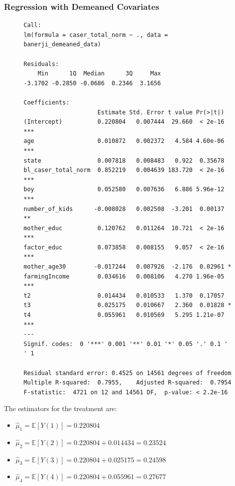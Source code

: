 \documentclass{article}
\begin{document}
\subsubsection*{Regression with Demeaned Covariates}
\begin{figure}[H]
\begin{lstlisting}[style=RstyleComment, caption=Regression with Demeaned Covariates]
Call:
lm(formula = caser_total_norm ~ ., data = banerji_demeaned_data)

Residuals:
    Min      1Q  Median      3Q     Max 
-3.1702 -0.2850 -0.0686  0.2346  3.1656 

Coefficients:
                     Estimate Std. Error t value Pr(>|t|)    
(Intercept)          0.220804   0.007444  29.660  < 2e-16 ***
age                  0.010872   0.002372   4.584 4.60e-06 ***
state                0.007818   0.008483   0.922  0.35678    
bl_caser_total_norm  0.852219   0.004639 183.720  < 2e-16 ***
boy                  0.052580   0.007636   6.886 5.96e-12 ***
number_of_kids      -0.008028   0.002508  -3.201  0.00137 ** 
mother_educ          0.120762   0.011264  10.721  < 2e-16 ***
factor_educ          0.073858   0.008155   9.057  < 2e-16 ***
mother_age30        -0.017244   0.007926  -2.176  0.02961 *  
farmingIncome        0.034616   0.008106   4.270 1.96e-05 ***
t2                   0.014434   0.010533   1.370  0.17057    
t3                   0.025175   0.010667   2.360  0.01828 *  
t4                   0.055961   0.010569   5.295 1.21e-07 ***
---
Signif. codes:  0 '***' 0.001 '**' 0.01 '*' 0.05 '.' 0.1 ' ' 1

Residual standard error: 0.4525 on 14561 degrees of freedom
Multiple R-squared:  0.7955,	Adjusted R-squared:  0.7954 
F-statistic:  4721 on 12 and 14561 DF,  p-value: < 2.2e-16
\end{lstlisting}
\end{figure}

The estimators for the treatment are:
\begin{itemize}
  \item $\hat{\mu}_1 = \mathbb{E}[Y(1)] = 0.220804$
  \item $\hat{\mu}_2 = \mathbb{E}[Y(2)] = 0.220804 + 0.014434 = 0.23524$
  \item $\hat{\mu}_3 = \mathbb{E}[Y(3)] = 0.220804 + 0.025175 = 0.24598$
  \item $\hat{\mu}_4 = \mathbb{E}[Y(4)] = 0.220804 + 0.055961 = 0.27677$
\end{itemize}
\end{document}
